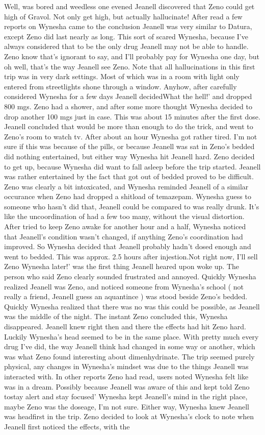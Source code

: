 \documentclass[12pt]{book}
\begin{document}
Well, was bored and weedless one evened Jeanell discovered that Zeno could get high of Gravol. Not only get high, but actually hallucinate! After read a few reports on Wynesha came to the conclusion Jeanell was very similar to Datura, except Zeno did last nearly as long. This sort of scared Wynesha, because I've always considered that to be the only drug Jeanell may not be able to handle. Zeno know that's ignorant to say, and I'll probably pay for Wynesha one day, but oh well, that's the way Jeanell see Zeno. Note that all hallucinations in this first trip was in very dark settings. Most of which was in a room with light only entered from streetlights shone through a window. Anyhow, after carefully considered Wynesha for a few days Jeanell decidedWhat the hell!' and dropped 800 mgs. Zeno had a shower, and after some more thought Wynesha decided to drop another 100 mgs just in case. This was about 15 minutes after the first dose. Jeanell concluded that would be more than enough to do the trick, and went to Zeno's room to watch tv. After about an hour Wynesha got rather tired. I'm not sure if this was because of the pills, or because Jeanell was sat in Zeno's bedded did nothing entertained, but either way Wynesha hit Jeanell hard. Zeno decided to get up, because Wynesha did want to fall asleep before the trip started. Jeanell was rather entertained by the fact that got out of bedded proved to be difficult. Zeno was clearly a bit intoxicated, and Wynesha reminded Jeanell of a similar occurance when Zeno had dropped a shitload of temazepam. Wynesha guess to someone who hasn't did that, Jeanell could be compared to was really drunk. It's like the uncoordination of had a few too many, without the visual distortion. After tried to keep Zeno awake for another hour and a half, Wynesha noticed that Jeanell's condition wasn't changed, if anything Zeno's coordination had improved. So Wynesha decided that Jeanell probably hadn't dosed enough and went to bedded. This was approx. 2.5 hours after injestion.Not right now, I'll sell Zeno Wynesha later!' was the first thing Jeanell heared upon woke up. The person who said Zeno clearly sounded frustrated and annoyed. Quickly Wynesha realized Jeanell was Zeno, and noticed someone from Wynesha's school ( not really a friend, Jeanell guess an aquantince ) was stood beside Zeno's bedded. Quickly Wynesha realized that there was no was this could be possible, as Jeanell was the middle of the night. The instant Zeno concluded this, Wynesha disappeared. Jeanell knew right then and there the effects had hit Zeno hard. Luckily Wynesha's head seemed to be in the same place. With pretty much every drug I've did, the way Jeanell think had changed in some way or another, which was what Zeno found interesting about dimenhydrinate. The trip seemed purely physical, any changes in Wynesha's mindset was due to the things Jeanell was interacted with. In other reports Zeno had read, users noted Wynesha felt like was in a dream. Possibly because Jeanell was aware of this and kept told Zeno tostay alert and stay focused' Wynesha kept Jeanell's mind in the right place, maybe Zeno was the doseage, I'm not sure. Either way, Wynesha knew Jeanell was headfirst in the trip. Zeno decided to look at Wynesha's clock to note when Jeanell first noticed the effects, with the 
\end{document}
